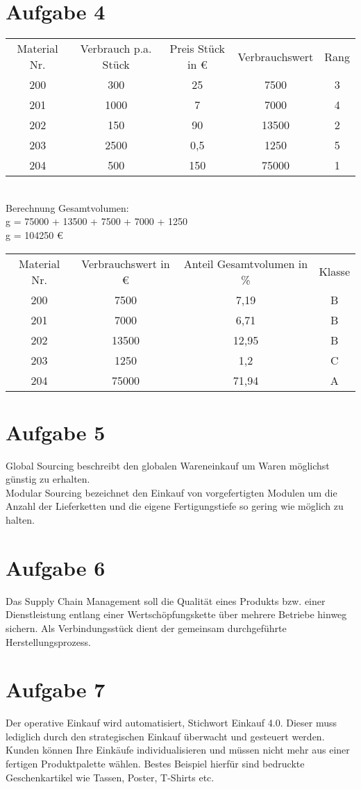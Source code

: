 \documentclass{article}
\begin{document}
	\section*{Aufgabe 4}
	\begin{tabular}[h]{c|c|c|c|c}
		Material Nr. & Verbrauch p.a. Stück & Preis Stück in € & Verbrauchswert & Rang \\
		200 & 300 & 25 & 7500 & 3 \\
		201 & 1000 & 7 & 7000 & 4 \\
		202 & 150 & 90 & 13500 & 2 \\
		203 & 2500 & 0,5 & 1250 & 5 \\
		204 & 500 & 150 & 75000 & 1
	\end{tabular} \\
	Berechnung Gesamtvolumen: \\
	g = 75000 + 13500 + 7500 + 7000 + 1250 \\
	g = 104250 €\\
	\begin{tabular}[h]{c|c|c|c}
		Material Nr. & Verbrauchswert in € & Anteil Gesamtvolumen in \% & Klasse \\
		200 & 7500 & 7,19 & B \\
		201 & 7000 & 6,71 & B \\
		202 & 13500 & 12,95 & B \\
		203 & 1250 & 1,2 & C \\
		204 & 75000 & 71,94 & A 
	\end{tabular}
	\section*{Aufgabe 5}
	Global Sourcing beschreibt den globalen Wareneinkauf um Waren möglichst günstig zu erhalten. \\
	Modular Sourcing bezeichnet den Einkauf von vorgefertigten Modulen um die Anzahl der Lieferketten und die eigene Fertigungstiefe so gering wie möglich zu halten. 
	\section*{Aufgabe 6}
	Das Supply Chain Management soll die Qualität eines Produkts bzw. einer Dienstleistung entlang einer Wertschöpfungskette über mehrere Betriebe hinweg sichern. Als Verbindungsstück dient der gemeinsam durchgeführte Herstellungsprozess.
	\section*{Aufgabe 7}
	Der operative Einkauf wird automatisiert, Stichwort Einkauf 4.0. Dieser muss lediglich durch den strategischen Einkauf überwacht und gesteuert werden. \\
	Kunden können Ihre Einkäufe individualisieren und müssen nicht mehr aus einer fertigen Produktpalette wählen. Bestes Beispiel hierfür sind bedruckte Geschenkartikel wie Tassen, Poster, T-Shirts etc.
\end{document}
